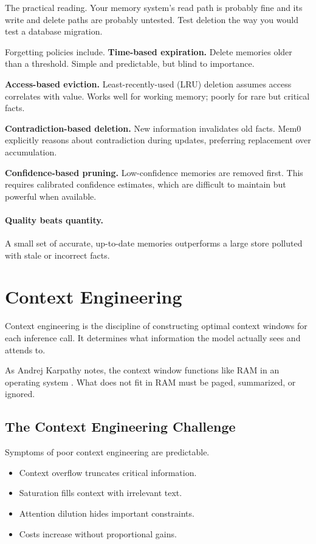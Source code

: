 The practical reading. Your memory system's read path is probably fine and its
write and delete paths are probably untested. Test deletion the way you would test
a database migration.

Forgetting policies include. \textbf{Time-based expiration.}
Delete memories older than a threshold. Simple and predictable, but blind to importance.

\textbf{Access-based eviction.}
Least-recently-used (LRU) deletion assumes access correlates with value. Works well for working memory; poorly for rare but critical facts.

\textbf{Contradiction-based deletion.}
New information invalidates old facts. Mem0 explicitly reasons about contradiction during updates, preferring replacement over accumulation.

\textbf{Confidence-based pruning.}
Low-confidence memories are removed first. This requires calibrated confidence estimates, which are difficult to maintain but powerful when available.

\paragraph{Quality beats quantity.}
A small set of accurate, up-to-date memories outperforms a large store polluted with stale or incorrect facts.

\section{Context Engineering}

Context engineering is the discipline of constructing optimal context windows for each inference call. It determines what information the model actually sees and attends to.

As Andrej Karpathy notes, the context window functions like RAM in an operating system \cite{langchain2025context}. What does not fit in RAM must be paged, summarized, or ignored.

\subsection{The Context Engineering Challenge}

Symptoms of poor context engineering are predictable.
\begin{itemize}
\item Context overflow truncates critical information.
\item Saturation fills context with irrelevant text.
\item Attention dilution hides important constraints.
\item Costs increase without proportional gains.
\end{itemize}

